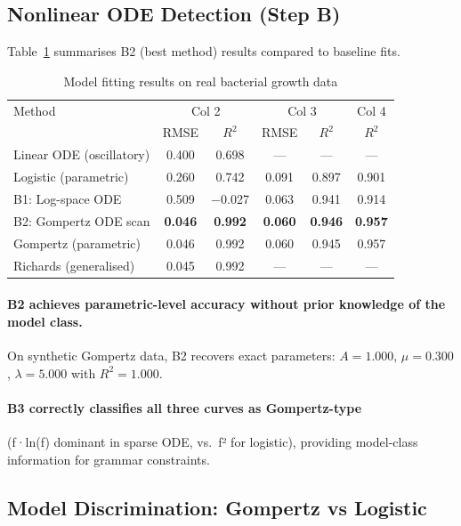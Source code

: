 \documentclass[11pt,a4paper]{article}
\begin{document}
\subsection{Nonlinear ODE Detection (Step B)}

Table~\ref{tab:results_b} summarises B2 (best method) results compared to baseline fits.

\begin{table}[h]
\centering
\caption{Model fitting results on real bacterial growth data}
\label{tab:results_b}
\begin{tabular}{lccccc}
\toprule
Method & \multicolumn{2}{c}{Col 2} & \multicolumn{2}{c}{Col 3} & Col 4 \\
 & RMSE & $R^2$ & RMSE & $R^2$ & $R^2$ \\
\midrule
Linear ODE (oscillatory) & 0.400 & 0.698 & --- & --- & --- \\
Logistic (parametric)    & 0.260 & 0.742 & 0.091 & 0.897 & 0.901 \\
B1: Log-space ODE        & 0.509 & $-$0.027 & 0.063 & 0.941 & 0.914 \\
B2: Gompertz ODE scan    & \textbf{0.046} & \textbf{0.992} & \textbf{0.060} & \textbf{0.946} & \textbf{0.957} \\
Gompertz (parametric)    & 0.046 & 0.992 & 0.060 & 0.945 & 0.957 \\
Richards (generalised)   & 0.045 & 0.992 & --- & --- & --- \\
\bottomrule
\end{tabular}
\end{table}

\paragraph{B2 achieves parametric-level accuracy without prior knowledge of the model class.}
On synthetic Gompertz data, B2 recovers exact parameters:
$A=1.000$, $\mu=0.300$, $\lambda=5.000$ with $R^2=1.000$.

\paragraph{B3 correctly classifies all three curves as Gompertz-type} (f·ln(f) dominant in
sparse ODE, vs.\ f² for logistic), providing model-class information for grammar constraints.

\subsection{Model Discrimination: Gompertz vs Logistic}
\end{document}
